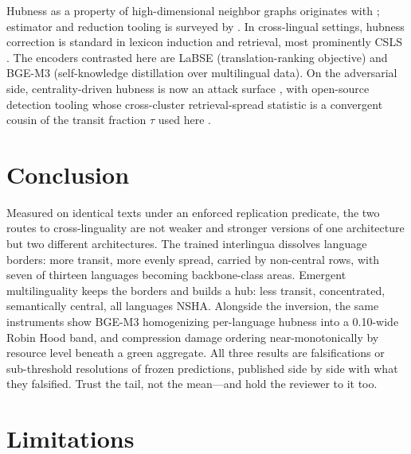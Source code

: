 \documentclass[11pt]{article}
\begin{document}
Hubness as a property of high-dimensional neighbor graphs originates with
\citet{radovanovic2010hubs}; estimator and reduction tooling is surveyed
by \citet{feldbauer2020scikit}. In cross-lingual settings, hubness
correction is standard in lexicon induction and retrieval, most
prominently CSLS \cite{conneau2018word}.
The encoders contrasted here are LaBSE \cite{feng2022labse}
(translation-ranking objective) and BGE-M3 \cite{chen2024bgem3}
(self-knowledge distillation over multilingual data).
On the adversarial side, centrality-driven hubness is now an attack
surface \cite{blackhole2026}, with open-source detection tooling whose
cross-cluster retrieval-spread statistic is a convergent cousin of the
transit fraction $\tau$ used here \cite{advhubness2026}.

\section{Conclusion}

Measured on identical texts under an enforced replication predicate, the
two routes to cross-linguality are not weaker and stronger versions of one
architecture but two different architectures. The trained interlingua
dissolves language borders: more transit, more evenly spread, carried by
non-central rows, with seven of thirteen languages becoming backbone-class
areas. Emergent multilinguality keeps the borders and builds a hub: less
transit, concentrated, semantically central, all languages NSHA. Alongside
the inversion, the same instruments show BGE-M3 homogenizing per-language
hubness into a 0.10-wide Robin Hood band, and compression damage ordering
near-monotonically by resource level beneath a green aggregate. All three
results are falsifications or sub-threshold resolutions of frozen
predictions, published side by side with what they falsified. Trust the
tail, not the mean---and hold the reviewer to it too.

\section*{Limitations}
\end{document}
